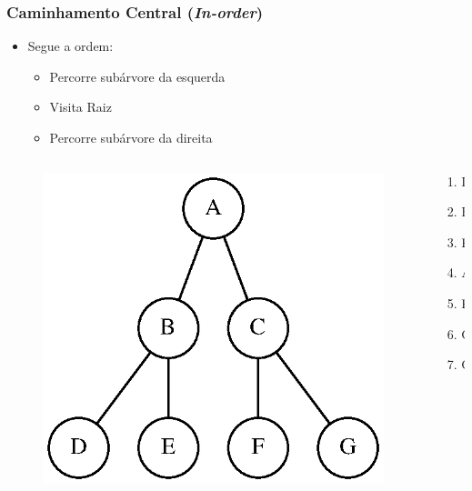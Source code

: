 \documentclass[aspectratio=169]{beamer}
\begin{document}
\begin{frame}\frametitle{Caminhamento Central (\emph{In-order})	}
\begin{itemize}
	\item Segue a ordem:
	\begin{itemize}
		\item Percorre subárvore da esquerda
		\item Visita Raiz
		\item Percorre subárvore da direita
	\end{itemize}
\end{itemize}
\begin{columns}[T]
\begin{column}{0.7\linewidth}
\begin{figure}[h]
	\centering
	\includegraphics[height=0.4\paperheight]{imagens/arvore_binaria08.eps}
\end{figure}
\end{column}
\begin{column}{0.3\linewidth}
\pause
\begin{enumerate}
	\item D
	\item B
	\item E
	\item A
	\item F
	\item C
	\item G
\end{enumerate}
\end{column}
\end{columns}
\end{frame}
\end{document}
